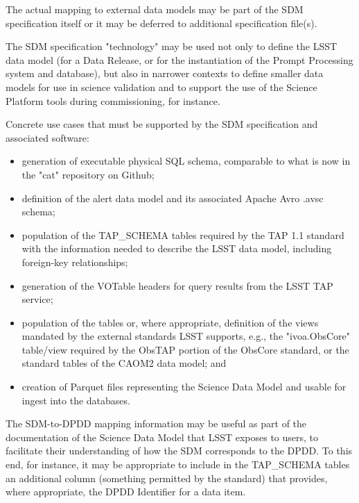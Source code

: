 The actual mapping to external data models may be part of the SDM specification itself or it may be deferred to additional specification file(s).

The SDM specification "technology" may be used not only to define the LSST data model (for a Data Release, or for the instantiation of the Prompt Processing system and database), but also in narrower contexts to define smaller data models for use in science validation and to support the use of the Science Platform tools during commissioning, for instance.

Concrete use cases that must be supported by the SDM specification and associated software:

\begin{itemize}
\item     generation of executable physical SQL schema, comparable to what is now in the "cat" repository on Github;
\item     definition of the alert data model and its associated Apache Avro .avsc schema;
\item     population of the TAP\_SCHEMA tables required by the TAP 1.1 standard with the information needed to describe the LSST data model, including foreign-key relationships;
\item     generation of the VOTable headers for query results from the LSST TAP service;
\item     population of the tables or, where appropriate, definition of the views mandated by the external standards LSST supports, e.g., the "ivoa.ObsCore" table/view required by the ObsTAP portion of the ObsCore standard, or the standard tables of the CAOM2 data model; and
\item     creation of Parquet files representing the Science Data Model and usable for ingest into the databases.
\end{itemize}

The SDM-to-DPDD mapping information may be useful as part of the documentation of the Science Data Model that LSST exposes to users, to facilitate their understanding of how the SDM corresponds to the DPDD.  To this end, for instance, it may be appropriate to include in the TAP\_SCHEMA tables an additional column (something permitted by the standard) that provides, where appropriate, the DPDD Identifier for a data item.


